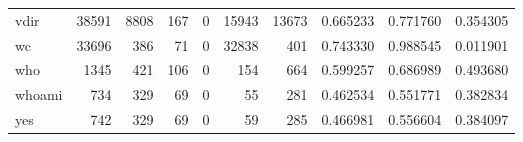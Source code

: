 \begin{tabular}{lrrrrrrrrr}
vdir      &                                              38591 &                                               8808 &                                                167 &                                                  0 &                                              15943 &                                              13673 &                                           0.665233 &                               0.771760 &                             0.354305 \\
wc        &                                              33696 &                                                386 &                                                 71 &                                                  0 &                                              32838 &                                                401 &                                           0.743330 &                               0.988545 &                             0.011901 \\
who       &                                               1345 &                                                421 &                                                106 &                                                  0 &                                                154 &                                                664 &                                           0.599257 &                               0.686989 &                             0.493680 \\
whoami    &                                                734 &                                                329 &                                                 69 &                                                  0 &                                                 55 &                                                281 &                                           0.462534 &                               0.551771 &                             0.382834 \\
yes       &                                                742 &                                                329 &                                                 69 &                                                  0 &                                                 59 &                                                285 &                                           0.466981 &                               0.556604 &                             0.384097 \\
\bottomrule
\end{tabular}
